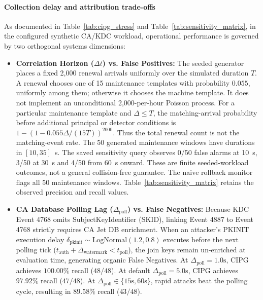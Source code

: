 \paragraph{Collection delay and attribution trade-offs}
As documented in Table~\ref{tab:cipg_stress} and Table~\ref{tab:sensitivity_matrix}, in the configured synthetic CA/KDC workload, operational performance is governed by two orthogonal systems dimensions:
\begin{itemize}
    \item \textbf{Correlation Horizon ($\Delta t$) vs. False Positives:} The seeded generator places a fixed 2,000 renewal arrivals uniformly over the simulated duration $T$. A renewal chooses one of 15 maintenance templates with probability $0.055$, uniformly among them; otherwise it chooses the machine template. It does not implement an unconditional 2,000-per-hour Poisson process. For a particular maintenance template and $\Delta\le T$, the matching-arrival probability before additional principal or detector conditions is $1-(1-0.055\Delta/(15T))^{2000}$. Thus the total renewal count is not the matching-event rate. The 50 generated maintenance windows have durations in $[10,35]$~s. The saved sensitivity query observes 0/50 false alarms at 10~s, 3/50 at 30~s and 4/50 from 60~s onward. These are finite seeded-workload outcomes, not a general collision-free guarantee. The naive rollback monitor flags all 50 maintenance windows. Table~\ref{tab:sensitivity_matrix} retains the observed precision and recall values.
    \item \textbf{CA Database Polling Lag ($\Delta_{\text{poll}}$) vs. False Negatives:} Because KDC Event 4768 omits SubjectKeyIdentifier (SKID), linking Event 4887 to Event 4768 strictly requires CA Jet DB enrichment. When an attacker's PKINIT execution delay $\delta_{\text{pkinit}} \sim \text{LogNormal}(1.2, 0.8)$ executes before the next polling tick ($t_{\text{auth}} + \Delta_{\text{watermark}} < t_{\text{poll}}$), the join keys remain un-enriched at evaluation time, generating organic False Negatives. At $\Delta_{\text{poll}} = 1.0\text{s}$, CIPG achieves $100.00\%$ recall ($48/48$). At default $\Delta_{\text{poll}} = 5.0\text{s}$, CIPG achieves $97.92\%$ recall ($47/48$). At $\Delta_{\text{poll}} \in \{15\text{s}, 60\text{s}\}$, rapid attacks beat the polling cycle, resulting in $89.58\%$ recall ($43/48$).
\end{itemize}


